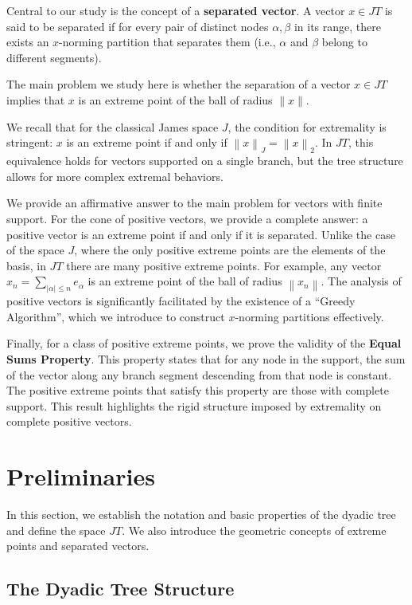 \documentclass[11pt,a4paper]{amsart}
\newcommand{\JT}{JT}
\newcommand{\norm}[1]{\left\lVert#1\right\rVert}
\newcommand{\J}{J}
\begin{document}
Central to our study is the concept of a \textbf{separated vector}. A vector $x \in \JT$ is said to be separated if for every pair of distinct nodes $\alpha, \beta$ in its range, there exists an $x$-norming partition that separates them (i.e., $\alpha$ and $\beta$ belong to different segments).

The main problem we study here is whether the separation of a vector $x \in \JT$ implies that $x$ is an extreme point of the ball of radius $\|x\|$.

We recall that for the classical James space $\J$, the condition for extremality is stringent: $x$ is an extreme point if and only if $\norm{x}_{\J} = \norm{x}_2$. In $\JT$, this equivalence holds for vectors supported on a single branch, but the tree structure allows for more complex extremal behaviors.

We provide an affirmative answer to the main problem for vectors with finite support. For the cone of positive vectors, we provide a complete answer: a positive vector is an extreme point if and only if it is separated. Unlike the case of the space $\J$, where the only positive extreme points are the elements of the basis, in $\JT$ there are many positive extreme points. For example, any vector $x_n= \sum_{|\alpha | \le n} e_{\alpha}$ is an extreme point of the ball of radius $\norm{x_n}$. The analysis of positive vectors is significantly facilitated by the existence of a ``Greedy Algorithm'', which we introduce to construct $x$-norming partitions effectively.

Finally, for a class of positive extreme points, we prove the validity of the \textbf{Equal Sums Property}. This property states that for any node in the support, the sum of the vector along any branch segment descending from that node is constant. The positive extreme points that satisfy this property are those with complete support. This result highlights the rigid structure imposed by extremality on complete positive vectors.


\section{Preliminaries}

In this section, we establish the notation and basic properties of the dyadic tree and define the space $\JT$. We also introduce the geometric concepts of extreme points and separated vectors.

\subsection{The Dyadic Tree Structure}
\end{document}
